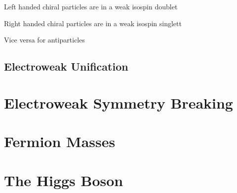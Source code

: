 Left handed chiral particles are in a weak isospin doublet

Right handed chiral particles are in a weak isospin singlett

Vice versa for antiparticles


\subsection{Electroweak Unification}

\section{Electroweak Symmetry Breaking}

\section{Fermion Masses}

\section{The Higgs Boson}


\clearpage


